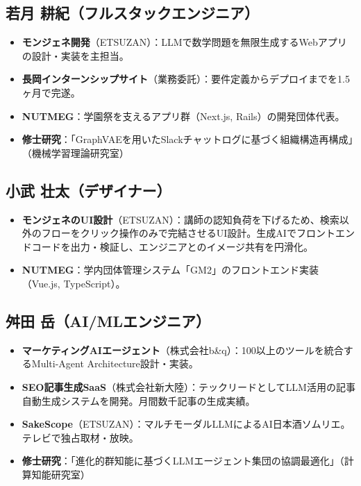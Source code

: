 \documentclass[paper=a4,fontsize=10.5bp,jafontsize=10.5bp,twocolumn]{jlreq}
\begin{document}
\subsection*{若月 耕紀（フルスタックエンジニア）}

\begin{itemize}
  \item \textbf{モンジェネ開発}（ETSUZAN）：LLMで数学問題を無限生成するWebアプリの設計・実装を主担当。
  \item \textbf{長岡インターンシップサイト}（業務委託）：要件定義からデプロイまでを1.5ヶ月で完遂。
  \item \textbf{NUTMEG}：学園祭を支えるアプリ群（Next.js, Rails）の開発団体代表。
  \item \textbf{修士研究}：「GraphVAEを用いたSlackチャットログに基づく組織構造再構成」（機械学習理論研究室）
\end{itemize}

\subsection*{小武 壮太（デザイナー）}

\begin{itemize}
  \item \textbf{モンジェネのUI設計}（ETSUZAN）：講師の認知負荷を下げるため、検索以外のフローをクリック操作のみで完結させるUI設計。生成AIでフロントエンドコードを出力・検証し、エンジニアとのイメージ共有を円滑化。
  \item \textbf{NUTMEG}：学内団体管理システム「GM2」のフロントエンド実装（Vue.js, TypeScript）。
\end{itemize}

\subsection*{舛田 岳（AI/MLエンジニア）}

\begin{itemize}
  \item \textbf{マーケティングAIエージェント}（株式会社b\&q）：100以上のツールを統合するMulti-Agent Architecture設計・実装。
  \item \textbf{SEO記事生成SaaS}（株式会社新大陸）：テックリードとしてLLM活用の記事自動生成システムを開発。月間数千記事の生成実績。
  \item \textbf{SakeScope}（ETSUZAN）：マルチモーダルLLMによるAI日本酒ソムリエ。テレビで独占取材・放映。
  \item \textbf{修士研究}：「進化的群知能に基づくLLMエージェント集団の協調最適化」（計算知能研究室）
\end{itemize}
\end{document}

